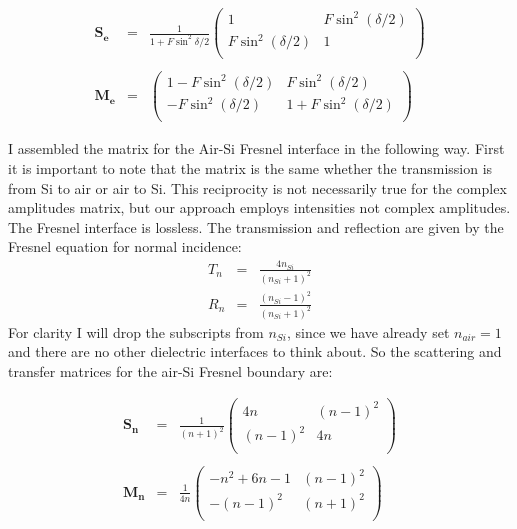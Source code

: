 \begin{eqnarray}
\boldsymbol{S_e}&=&\frac{1}{1+F\sin^2{\delta/2}} \left(
\begin{array}{cc}
1 & F \sin ^2(\delta/2) \\
F \sin ^2(\delta/2) & 1 \\
\end{array}
\right) \nonumber \\
\nonumber \\
\boldsymbol{M_e}&=&\left(
\begin{array}{cc}
 1-F \sin ^2(\delta/2) & F \sin ^2(\delta/2) \\
 -F \sin ^2(\delta/2) & 1+F \sin ^2(\delta/2) \\
\end{array}
\right)
\label{eqn:EtalonMatrix}
\end{eqnarray}

I assembled the matrix for the Air-Si Fresnel interface in the following way.  First it is important to note that the matrix is the same whether the transmission is from Si to air or air to Si.  This reciprocity is not necessarily true for the complex amplitudes matrix, but our approach employs intensities not complex amplitudes.  The Fresnel interface is lossless.  The transmission and reflection are given by the Fresnel equation for normal incidence:
\begin{eqnarray}
T_n&=&\frac{4n_{Si}}{(n_{Si}+1)^2} \\
R_n&=&\frac{(n_{Si}-1)^2}{(n_{Si}+1)^2} \label{eq:FresnelTrans}
\end{eqnarray}
For clarity I will drop the subscripts from $n_{Si}$, since we have already set $n_{air}=1$ and there are no other dielectric interfaces to think about.  So the scattering and transfer matrices for the air-Si Fresnel boundary are:

\begin{eqnarray}
\boldsymbol{S_n}&=&\frac{1}{(n+1)^2} \left(
\begin{array}{cc}
4n & (n-1)^2 \\
(n-1)^2 & 4n \\
\end{array}
\right)  \nonumber \\
\nonumber \\
\boldsymbol{M_n}&=&\frac{1}{4n}\left(
\begin{array}{cc}
 -n^2+6  n-1 & ( n-1)^2 \\
 -( n-1)^2 & ( n+1)^2 \\
\end{array}
\right)
\label{eqn:SiAirMatrix}
\end{eqnarray}

